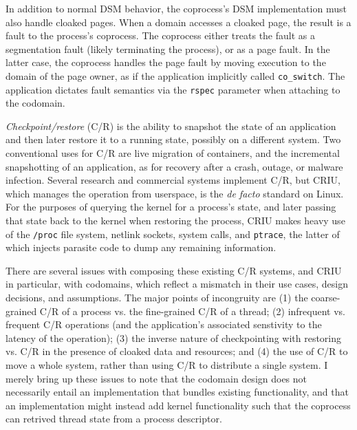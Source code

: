In addition to normal DSM behavior, the coprocess's DSM implementation must
also handle cloaked pages.
%
When a domain accesses a cloaked page, the result is a fault to the process's
coprocess.
%
The coprocess either treats the fault as a segmentation fault (likely
terminating the process), or as a page fault.
%
In the latter case, the coprocess handles the page fault by moving execution to
the domain of the page owner, as if the application implicitly called
\texttt{co\_switch}.
%
The application dictates fault semantics via the \texttt{rspec} parameter when
attaching to the codomain.


%
\emph{Checkpoint/restore} (C/R) is the ability to snapshot the state of an
application and then later restore it to a running state, possibly
on a different system.
%
Two conventional uses for C/R are live migration of containers,
and the incremental snapshotting of an application, as for recovery
after a crash, outage, or malware infection.
%
Several research and commercial systems implement C/R, but CRIU, which manages
the operation from userspace, is the \emph{de facto} standard on Linux.
%
For the purposes of querying the kernel for a process's state, and later
passing that state back to the kernel when restoring the process,
CRIU makes heavy use of the \texttt{/proc} file system, netlink sockets,
system calls, and \texttt{ptrace}, the latter of which injects parasite code
to dump any remaining information.


There are several issues with composing these existing C/R systems, and CRIU in
particular, with codomains, which reflect a mismatch in their use cases, design
decisions, and assumptions.
%
The major points of incongruity are (1) the coarse-grained C/R of a process vs.
the fine-grained C/R of a thread; (2) infrequent vs. frequent C/R operations
(and the application's associated senstivity to the latency of the operation);
(3) the inverse nature of checkpointing with restoring vs. C/R in the presence
of cloaked data and resources; and (4) the use of C/R to move a whole system,
rather than using C/R to distribute a single system.
%
I merely bring up these issues to note that the codomain design does not
necessarily entail an implementation that bundles existing functionality, and
that an implementation might instead add kernel functionality such that the
coprocess can retrived thread state from a process descriptor.


